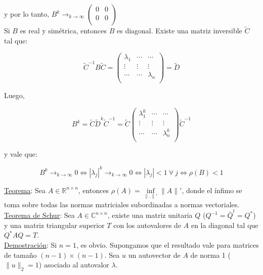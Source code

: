 y por lo tanto, $B^{k} \rightarrow_{k \rightarrow \infty} 
	\begin{pmatrix}
        0 & 0\\
        0 & 0\\
	\end{pmatrix}
$\\

Si $B$ es real y sim\'etrica, entonces $B$ es diagonal. Existe una matriz inversible $\tilde{C}$ tal que:

$$\tilde{C}^{-1}B\tilde{C} =
	\begin{pmatrix}
        \lambda_{1} & \cdots & \cdots\\
        \vdots & \vdots & \vdots\\
        \cdots & \cdots & \lambda_{n}\\
	\end{pmatrix}
	= \tilde{D}
$$

Luego,

$$B^{k} = \tilde{C}\tilde{D}^{k}\tilde{C}^{-1} = \tilde{C}
	\begin{pmatrix}
        \lambda_{1}^{k} & \cdots & \cdots\\
        \vdots & \vdots & \vdots\\
        \cdots & \cdots & \lambda_{n}^{k}\\
	\end{pmatrix}
	\tilde{C}^{-1}
$$

y vale que:

$$B^{k} \rightarrow_{k \rightarrow \infty} 0 \iff |\lambda_{j}|^{k} \rightarrow_{k \rightarrow \infty} 0 \iff |\lambda_{j}| < 1\ \forall \ j \iff \rho(B) < 1$$

\underline{Teorema}: Sea $A \in \mathbb{R}^{n \times n}$, entonces $\rho(A) = \inf \limits_{\|.\|'} \|A\|'$, donde el \'infimo se toma sobre todas las normas matriciales subordinadas a normas vectoriales.\\

\underline{Teorema de Schur}: Sea $A \in \mathbb{C}^{n \times n}$, existe una matriz unitaria $Q$ ($Q^{-1} = \bar{Q}^{t} = Q^{*}$) y una matriz triangular superior $T$ con los autovalores de $A$ en la diagonal tal que $Q^{*}AQ = T$.\\

\underline{Demostraci\'on}: Si $n = 1$, es obvio. Supongamos que el resultado vale para matrices de tama\~no $(n - 1) \times (n - 1)$. Sea $u$ un autovector de $A$ de norma 1 ($\|u\|_{2} = 1$) asociado al autovalor $\lambda$.\\

